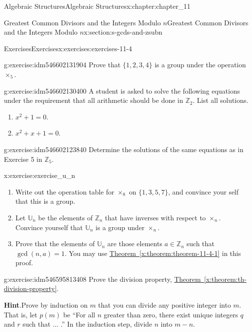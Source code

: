 \documentclass[oneside,10pt,]{book}
\newcommand{\blocktitlefont}{\relax}
\newcommand{\xreffont}{\relax}
\numberwithin{equation}{section}
\begin{document}
\begin{chapterptx}{Algebraic Structures}{}{Algebraic Structures}{}{}{x:chapter:chapter_11}
\begin{sectionptx}{Greatest Common Divisors  and the Integers Modulo \(n\)}{}{Greatest Common Divisors  and the Integers Modulo \(n\)}{}{}{x:section:s-gcds-and-zsubn}
\begin{exercises-subsection}{Exercises}{}{Exercises}{}{}{x:exercises:exercises-11-4}
\begin{divisionexercise}{6}{}{}{g:exercise:idm546602131904}
Prove that \(\{1, 2, 3, 4\}\) is a group under the operation \(\times_5 \).%
\end{divisionexercise}%
\begin{divisionexercise}{7}{}{}{g:exercise:idm546602130400}%
A student is asked to solve the following equations under the requirement that all arithmetic should be done in \(\mathbb{Z}_2\). List all solutions.%
\begin{enumerate}[label=(\alph*)]
\item{}\(x^2 + 1 = 0\).%
\item{}\(x^2 + x + 1 = 0\).%
\end{enumerate}
%
\end{divisionexercise}%
\begin{divisionexercise}{8}{}{}{g:exercise:idm546602123840}%
Determine the solutions of the same equations as in Exercise 5 in \(\mathbb{Z}_5\).%
\end{divisionexercise}%
\begin{divisionexercise}{9}{}{}{x:exercise:exercise_u_n}%
%
\begin{enumerate}[label=(\alph*)]
\item{}Write out the operation table for \(\times_8\) on \(\{1,3,5,7\}\), and convince your self that this is a group.%
\item{}Let \(\mathbb{U}_{n}\) be the elements of \(\mathbb{Z}_{n}\) that have inverses with respect to \(\times_{n}\).  Convince yourself that \(\mathbb{U}_{n}\) is a group under \(\times_{n}\).%
\item{}Prove that the elements of \(\mathbb{U}_{n}\)  are those elements  \(a\in \mathbb{Z}_{n} \) such that \(\gcd(n,a)=1\).  You may use  \hyperref[x:theorem:theorem-11-4-1]{Theorem~{\xreffont\ref{x:theorem:theorem-11-4-1}}} in this proof.%
\end{enumerate}
%
\end{divisionexercise}%
\begin{divisionexercise}{10}{}{}{g:exercise:idm546595813408}%
Prove the division property, \hyperref[x:theorem:th-division-property]{Theorem~{\xreffont\ref{x:theorem:th-division-property}}}.%
\par\smallskip%
\noindent\textbf{\blocktitlefont Hint}.\hypertarget{g:hint:idm546595811968}{}\quad{}Prove by induction on \(m\) that you can divide any positive integer into \(m\). That is, let \(p(m)\) be ``For all \(n\) greater than zero, there exist unique integers \(q\) and \(r\) such that \(\dots\) .''  In the induction step, divide \(n\) into \(m - n\).%
\end{divisionexercise}%

\end{exercises-subsection}
\end{sectionptx}
\end{chapterptx}
\end{document}
